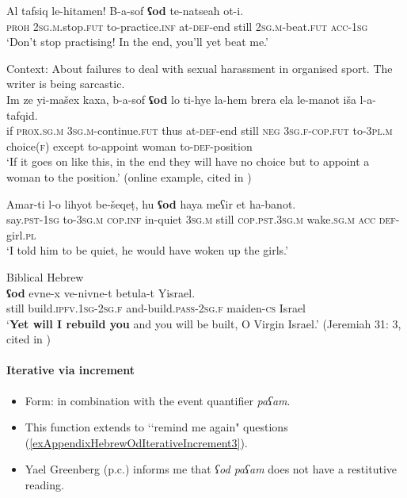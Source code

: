 \begin{exe}
	\ex \gll Al tafsiq le-hitamen! B-a-sof \textbf{ʕod} te-natseaħ ot-i.\\
	\textsc{proh} 2\textsc{sg}.\textsc{m}.stop.\textsc{fut} to-practice.\textsc{inf} at-\textsc{def}-end still 2\textsc{sg}.\textsc{m}-beat.\textsc{fut} \textsc{acc}-1\textsc{sg}\\
	\glt \lq Don't stop practising! In the end, you'll yet beat me.\rq{ }\parencite{FrancezOd}	
	
	\ex Context: About failures to deal with sexual harassment in organised sport. The writer is being sarcastic. \label{appendixHebrewOdEventually3}\\
	\gll Im ze yi-mašex kaxa, b-a-sof \textbf{ʕod} lo ti-hye la-hem brera ela le-manot  iša l-a-tafqid.\\
	if \textsc{prox}.\textsc{sg}.\textsc{m} 3\textsc{sg}.\textsc{m}-continue.\textsc{fut} thus at-\textsc{def}-end still \textsc{neg} 3\textsc{sg}.\textsc{f}-\textsc{cop}.\textsc{fut} to-3\textsc{pl}.\textsc{m} choice(\textsc{f}) except to-appoint woman to-\textsc{def}-position\\
	\glt \lq If it goes on like this, in the end they will have no choice but to appoint a woman to the position.\rq{ }(online example, cited in \cite{FrancezOd})
	
	\ex 
	\gll Amar-ti l-o lihyot be-šeqeṭ, hu \textbf{ʕod} haya meʕir et ha-banot.	 \label{appendixHebrewOdEventually4}\\
	say.\textsc{pst}-1\textsc{sg} to-3\textsc{sg}.\textsc{m} \textsc{cop}.\textsc{inf} in-quiet 3\textsc{sg}.\textsc{m} still \textsc{cop}.\textsc{pst}.3\textsc{sg}.\textsc{m} wake.\textsc{sg}.\textsc{m} \textsc{acc} \textsc{def}-girl.\textsc{pl}\\
	\glt \lq I told him to be quiet, he would have woken up the girls.\rq{ }\parencite{FrancezOd}
	
	\ex Biblical Hebrew\label{exAppendixProspectiveHebrewBible}\\
	\gll \textbf{ʕod} evne-x ve-nivne-t betula-t Yisrael.\\
	still build.\textsc{ipfv}.1\textsc{sg}-2\textsc{sg}.\textsc{f} and-build.\textsc{pass}-2\textsc{sg}.\textsc{f} maiden-\textsc{cs} Israel\\
	\glt \lq \textbf{Yet will I rebuild you} and you will be built, O Virgin Israel.\rq{ }(Jeremiah 31: 3, cited in \cite{FrancezOd})
\end{exe}

\paragraph{Iterative via increment}
\label{appendixHebrewOdIterativeIncrement}
\begin{itemize}
	\item Form: in combination with the event quantifier \textit{paʕam}.
	\item This function extends to \lq\lq remind me again" questions (\ref{exAppendixHebrewOdIterativeIncrement3}).
	\item Yael Greenberg (p.c.) informs me that \textit{ʕod paʕam} does not have a restitutive reading.
\end{itemize}	

